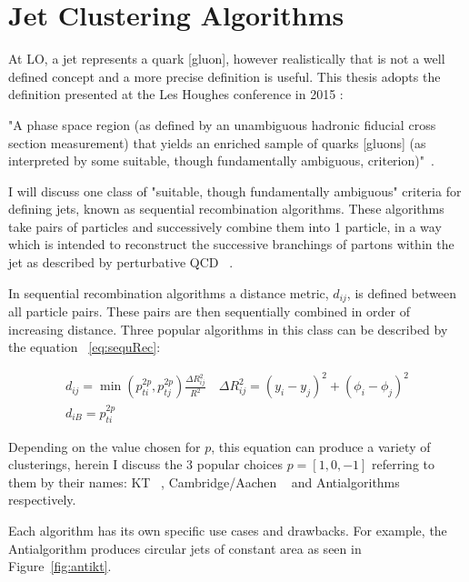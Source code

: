 \section{Jet Clustering Algorithms}\label{secSM:ch1}

At LO, a jet represents a quark [gluon], however realistically that is not a well defined concept and a more precise definition is useful. This thesis adopts the definition presented at the Les Houghes conference in 2015 :\newline

"A phase space region (as defined by an unambiguous hadronic fiducial cross section measurement) that yields an enriched sample of quarks [gluons] (as interpreted by some suitable, though fundamentally ambiguous, criterion)"~\cite{Badger:2016bpw}.\newline 

I will discuss one class of "suitable, though fundamentally ambiguous" criteria for defining jets, known as sequential recombination algorithms. These algorithms take pairs of particles and successively combine them into 1 particle, in a way which is intended to reconstruct the successive branchings of partons within the jet as described by perturbative QCD ~\cite{Marzani:2019hun}.
 
In sequential recombination algorithms a distance metric, $d_{ij}$, is defined between all particle pairs. These pairs are then sequentially combined in order of increasing distance. Three popular algorithms in this class can be described by the equation ~\ref{eq:sequRec}:


\begin{equation}
\begin{array}{l}{d_{i j}=\min \left(p_{t i}^{2 p}, p_{t j}^{2 p}\right) \frac{\Delta R_{i j}^{2}}{R^{2}} \quad \Delta R_{i j}^{2}=\left(y_{i}-y_{j}\right)^{2}+\left(\phi_{i}-\phi_{j}\right)^{2}} \\ {d_{i B}=p_{t i}^{2 p}}\end{array}
\end{equation}\label{eq:sequRec}


Depending on the value chosen for $p$, this equation can produce a variety of clusterings, herein I discuss the 3 popular choices $p = [1, 0, -1]$ referring to them by their names: KT ~\cite{Ellis:1993tq}, Cambridge/Aachen ~\cite{Dokshitzer:1997in} and Anti\kt algorithms ~\cite{Cacciari:2008gp} respectively.

Each algorithm has its own specific use cases and drawbacks. For example, the Anti\kt algorithm produces circular jets of constant area as seen in Figure~\ref{fig:antikt}. 

